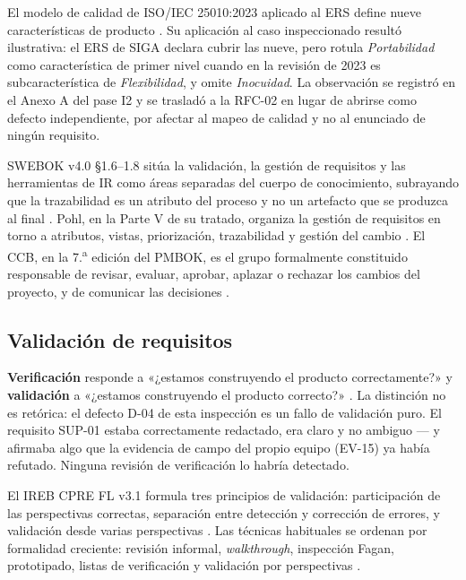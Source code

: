 \documentclass[11pt,letterpaper]{article}
\begin{document}
El modelo de calidad de ISO/IEC 25010:2023 aplicado al ERS define nueve características de producto \cite{iso25010}. Su aplicación al caso inspeccionado resultó ilustrativa: el ERS de SIGA declara cubrir las nueve, pero rotula \emph{Portabilidad} como característica de primer nivel cuando en la revisión de 2023 es subcaracterística de \emph{Flexibilidad}, y omite \emph{Inocuidad}. La observación se registró en el Anexo A del pase I2 y se trasladó a la RFC-02 en lugar de abrirse como defecto independiente, por afectar al mapeo de calidad y no al enunciado de ningún requisito.

SWEBOK v4.0 \S1.6--1.8 sitúa la validación, la gestión de requisitos y las herramientas de IR como áreas separadas del cuerpo de conocimiento, subrayando que la trazabilidad es un atributo del proceso y no un artefacto que se produzca al final \cite{swebok2024}. Pohl, en la Parte V de su tratado, organiza la gestión de requisitos en torno a atributos, vistas, priorización, trazabilidad y gestión del cambio \cite{pohl2025}. El CCB, en la 7.\textsuperscript{a} edición del PMBOK, es el grupo formalmente constituido responsable de revisar, evaluar, aprobar, aplazar o rechazar los cambios del proyecto, y de comunicar las decisiones \cite{pmbok2021}.

\subsection{Validación de requisitos}
\textbf{Verificación} responde a «¿estamos construyendo el producto correctamente?» y \textbf{validación} a «¿estamos construyendo el producto correcto?» \cite{iso29148}. La distinción no es retórica: el defecto D-04 de esta inspección es un fallo de validación puro. El requisito SUP-01 estaba correctamente redactado, era claro y no ambiguo --- y afirmaba algo que la evidencia de campo del propio equipo (EV-15) ya había refutado. Ninguna revisión de verificación lo habría detectado.

El IREB CPRE FL v3.1 formula tres principios de validación: participación de las perspectivas correctas, separación entre detección y corrección de errores, y validación desde varias perspectivas \cite{ireb2022}. Las técnicas habituales se ordenan por formalidad creciente: revisión informal, \emph{walkthrough}, inspección Fagan, prototipado, listas de verificación y validación por perspectivas \cite{pohl2025,wiegers2013}.
\end{document}
